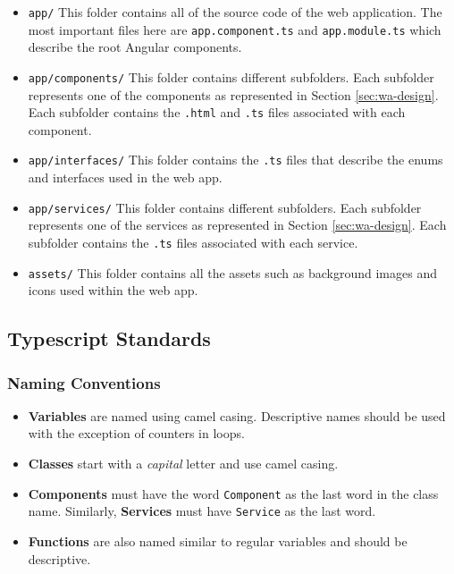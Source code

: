 \documentclass{article}
\begin{document}
    \begin{itemize}
        \item \texttt{app/}
            \subitem This folder contains all of the source code of the web
            application. The most important files here are
            \texttt{app.component.ts} and \texttt{app.module.ts} which describe
            the root Angular components.
        \item \texttt{app/components/}
            \subitem This folder contains different subfolders. Each subfolder
            represents one of the components as represented in Section
            \ref{sec:wa-design}. Each subfolder contains the \texttt{.html} and
            \texttt{.ts} files associated with each component.
        \item \texttt{app/interfaces/}
            \subitem This folder contains the \texttt{.ts} files that describe
            the enums and interfaces used in the web app.
        \item \texttt{app/services/}
            \subitem This folder contains different subfolders. Each subfolder
            represents one of the services as represented in Section
            \ref{sec:wa-design}. Each subfolder contains the \texttt{.ts} files
            associated with each service.
        \item \texttt{assets/}
            \subitem This folder contains all the assets such as background
            images and icons used within the web app.
    \end{itemize}

    \subsection{Typescript Standards}
    \label{sec:typescript}

    \subsubsection{Naming Conventions}
    \label{sec:typescript-nc}

    \begin{itemize}
        \item \textbf{Variables} are named using camel casing. Descriptive names
                should be used with the exception of counters in loops.
        \item \textbf{Classes} start with a \textit{capital} letter and use
                camel casing.
        \item \textbf{Components} must have the word \texttt{Component} as the
                last word in the class name. Similarly, \textbf{Services} must
                have \texttt{Service} as the last word.
        \item \textbf{Functions} are also named similar to regular variables and
                should be descriptive.
    \end{itemize}
\end{document}
